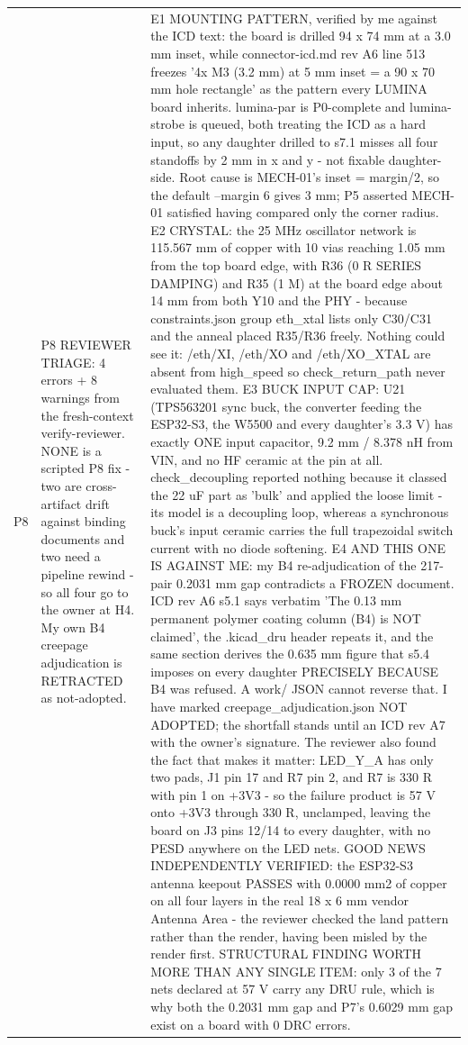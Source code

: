 \documentclass[11pt,a4paper]{article}
\begin{document}
{\begin{longtable}{lp{5.2cm}p{7.2cm}}
P8 & P8 REVIEWER TRIAGE: 4 errors + 8 warnings from the fresh-context verify-reviewer. NONE is a scripted P8 fix - two are cross-artifact drift against binding documents and two need a pipeline rewind - so all four go to the owner at H4. My own B4 creepage adjudication is RETRACTED as not-adopted. & E1 MOUNTING PATTERN, verified by me against the ICD text: the board is drilled 94 x 74 mm at a 3.0 mm inset, while connector-icd.md rev A6 line 513 freezes '4x M3 (3.2 mm) at 5 mm inset = a 90 x 70 mm hole rectangle' as the pattern every LUMINA board inherits. lumina-par is P0-complete and lumina-strobe is queued, both treating the ICD as a hard input, so any daughter drilled to s7.1 misses all four standoffs by 2 mm in x and y - not fixable daughter-side. Root cause is MECH-01's inset = margin/2, so the default --margin 6 gives 3 mm; P5 asserted MECH-01 satisfied having compared only the corner radius. E2 CRYSTAL: the 25 MHz oscillator network is 115.567 mm of copper with 10 vias reaching 1.05 mm from the top board edge, with R36 (0 R SERIES DAMPING) and R35 (1 M) at the board edge about 14 mm from both Y10 and the PHY - because constraints.json group eth\_xtal lists only C30/C31 and the anneal placed R35/R36 freely. Nothing could see it: /eth/XI, /eth/XO and /eth/XO\_XTAL are absent from high\_speed so check\_return\_path never evaluated them. E3 BUCK INPUT CAP: U21 (TPS563201 sync buck, the converter feeding the ESP32-S3, the W5500 and every daughter's 3.3 V) has exactly ONE input capacitor, 9.2 mm / 8.378 nH from VIN, and no HF ceramic at the pin at all. check\_decoupling reported nothing because it classed the 22 uF part as 'bulk' and applied the loose limit - its model is a decoupling loop, whereas a synchronous buck's input ceramic carries the full trapezoidal switch current with no diode softening. E4 AND THIS ONE IS AGAINST ME: my B4 re-adjudication of the 217-pair 0.2031 mm gap contradicts a FROZEN document. ICD rev A6 s5.1 says verbatim 'The 0.13 mm permanent polymer coating column (B4) is NOT claimed', the .kicad\_dru header repeats it, and the same section derives the 0.635 mm figure that s5.4 imposes on every daughter PRECISELY BECAUSE B4 was refused. A work/ JSON cannot reverse that. I have marked creepage\_adjudication.json NOT ADOPTED; the shortfall stands until an ICD rev A7 with the owner's signature. The reviewer also found the fact that makes it matter: LED\_Y\_A has only two pads, J1 pin 17 and R7 pin 2, and R7 is 330 R with pin 1 on +3V3 - so the failure product is 57 V onto +3V3 through 330 R, unclamped, leaving the board on J3 pins 12/14 to every daughter, with no PESD anywhere on the LED nets. GOOD NEWS INDEPENDENTLY VERIFIED: the ESP32-S3 antenna keepout PASSES with 0.0000 mm2 of copper on all four layers in the real 18 x 6 mm vendor Antenna Area - the reviewer checked the land pattern rather than the render, having been misled by the render first. STRUCTURAL FINDING WORTH MORE THAN ANY SINGLE ITEM: only 3 of the 7 nets declared at 57 V carry any DRU rule, which is why both the 0.2031 mm gap and P7's 0.6029 mm gap exist on a board with 0 DRC errors. \\

\end{longtable}}
\end{document}
